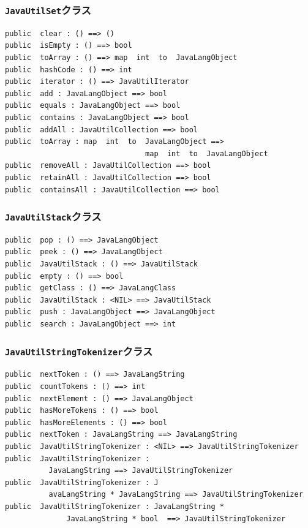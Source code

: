 \documentclass[\pformat,12pt]{jarticle}
\begin{document}
\subsubsection{\texttt{JavaUtilSet}クラス}
\begin{small}
\begin{verbatim}
public  clear : () ==> ()
public  isEmpty : () ==> bool
public  toArray : () ==> map  int  to  JavaLangObject
public  hashCode : () ==> int
public  iterator : () ==> JavaUtilIterator
public  add : JavaLangObject ==> bool
public  equals : JavaLangObject ==> bool
public  contains : JavaLangObject ==> bool
public  addAll : JavaUtilCollection ==> bool
public  toArray : map  int  to  JavaLangObject ==> 
                                map  int  to  JavaLangObject
public  removeAll : JavaUtilCollection ==> bool
public  retainAll : JavaUtilCollection ==> bool
public  containsAll : JavaUtilCollection ==> bool
\end{verbatim}
\end{small}

\subsubsection{\texttt{JavaUtilStack}クラス}
\begin{small}
\begin{verbatim}
public  pop : () ==> JavaLangObject
public  peek : () ==> JavaLangObject
public  JavaUtilStack : () ==> JavaUtilStack
public  empty : () ==> bool
public  getClass : () ==> JavaLangClass
public  JavaUtilStack : <NIL> ==> JavaUtilStack
public  push : JavaLangObject ==> JavaLangObject
public  search : JavaLangObject ==> int
\end{verbatim}
\end{small}

\subsubsection{\texttt{JavaUtilStringTokenizer}クラス}
\begin{small}
\begin{verbatim}
public  nextToken : () ==> JavaLangString
public  countTokens : () ==> int
public  nextElement : () ==> JavaLangObject
public  hasMoreTokens : () ==> bool
public  hasMoreElements : () ==> bool
public  nextToken : JavaLangString ==> JavaLangString
public  JavaUtilStringTokenizer : <NIL> ==> JavaUtilStringTokenizer
public  JavaUtilStringTokenizer : 
          JavaLangString ==> JavaUtilStringTokenizer
public  JavaUtilStringTokenizer : J
          avaLangString * JavaLangString ==> JavaUtilStringTokenizer
public  JavaUtilStringTokenizer : JavaLangString * 
              JavaLangString * bool  ==> JavaUtilStringTokenizer
\end{verbatim}
\end{small}
\end{document}
